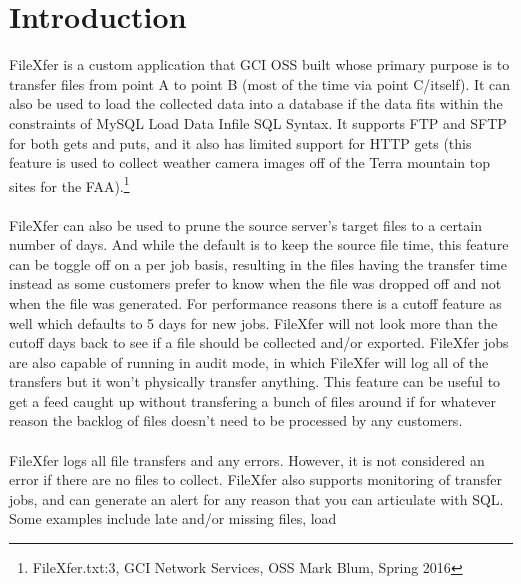 


\newpage
\setcounter{secnumdepth}{2}
\section{Introduction}
FileXfer is a custom application that GCI OSS built whose primary
purpose is to transfer files from point A to point B (most of the
time via point C/itself).  It can also be used to load the
collected data into a database if the data fits within the
constraints of MySQL Load Data Infile SQL Syntax.  It supports
FTP and SFTP for both gets and puts, and it also has limited
support for HTTP gets (this feature is used to collect weather
camera images off of the Terra mountain top sites for the
FAA).\footnote{FileXfer.txt:3, GCI Network Services, OSS Mark
Blum, Spring 2016}\\
\\
FileXfer can also be used to prune the source server's target
files to a certain number of days.  And while the default is
to keep the source file time, this feature can be toggle off
on a per job basis, resulting in the files having the transfer
time instead as some customers prefer to know when the file
was dropped off and not when the file was generated.  For
performance reasons there is a cutoff feature as well which
defaults to 5 days for new jobs.  FileXfer will not look more
than the cutoff days back to see if a file should be collected
and/or exported.  FileXfer jobs are also capable of running
in audit mode, in which FileXfer will log all of the transfers
but it won't physically transfer anything.  This feature can
be useful to get a feed caught up without transfering a bunch
of files around if for whatever reason the backlog of files
doesn't need to be processed by any customers.\\
\\
FileXfer logs all file transfers and any errors.  However, it
is not considered an error if there are no files to collect.
FileXfer also supports monitoring of transfer jobs, and can
generate an alert for any reason that you can articulate with
SQL.  Some examples include late and/or missing files, load
